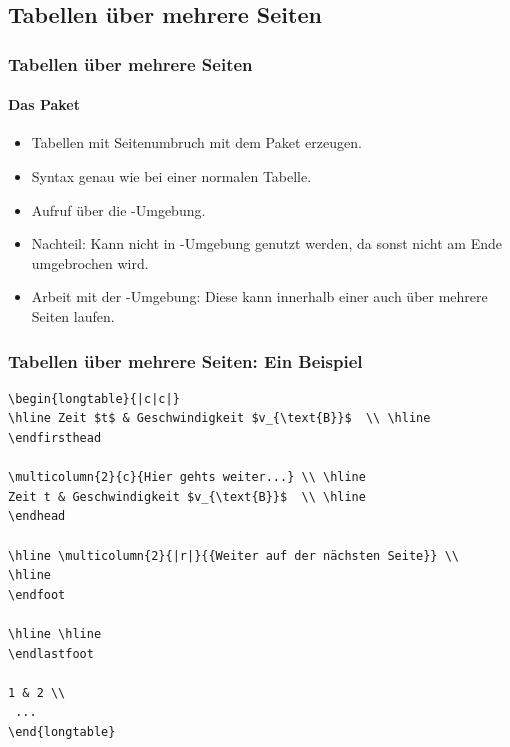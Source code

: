 \subsection{Tabellen über mehrere Seiten}

\begin{frame}[fragile]
\frametitle{Tabellen über mehrere Seiten}
\framesubtitle{Das Paket }
\begin{itemize}
\item Tabellen mit Seitenumbruch mit dem Paket  erzeugen.\pause
\item Syntax genau wie bei einer normalen Tabelle. \pause
\item Aufruf über die -Umgebung. \pause
\item Nachteil: Kann nicht in -Umgebung genutzt werden, da sonst nicht am Ende umgebrochen wird.\pause
\item Arbeit mit der -Umgebung: Diese kann innerhalb einer  auch über mehrere Seiten laufen. 
\end{itemize}
\end{frame}

\begin{frame}[fragile]
\frametitle{Tabellen über mehrere Seiten: Ein Beispiel}
\footnotesize
\begin{codeblock}
\begin{Verbatim}[fontsize=\tiny]  
\begin{longtable}{|c|c|}
\hline Zeit $t$ & Geschwindigkeit $v_{\text{B}}$  \\ \hline 
\endfirsthead

\multicolumn{2}{c}{Hier gehts weiter...} \\ \hline 
Zeit t & Geschwindigkeit $v_{\text{B}}$  \\ \hline 
\endhead

\hline \multicolumn{2}{|r|}{{Weiter auf der nächsten Seite}} \\ 
\hline
\endfoot

\hline \hline
\endlastfoot

1 & 2 \\ 
 ...
\end{longtable}
\end{Verbatim}
\end{codeblock}
\end{frame}

